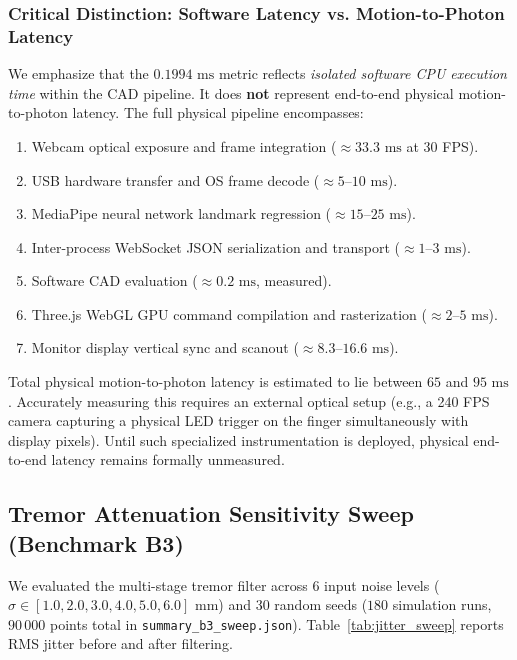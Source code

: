\subsubsection{Critical Distinction: Software Latency vs. Motion-to-Photon Latency}
We emphasize that the $0.1994\text{ ms}$ metric reflects \textit{isolated software CPU execution time} within the CAD pipeline. It does \textbf{not} represent end-to-end physical motion-to-photon latency. The full physical pipeline encompasses:
\begin{enumerate}
    \item Webcam optical exposure and frame integration ($\approx 33.3\text{ ms}$ at 30 FPS).
    \item USB hardware transfer and OS frame decode ($\approx 5$--$10\text{ ms}$).
    \item MediaPipe neural network landmark regression ($\approx 15$--$25\text{ ms}$).
    \item Inter-process WebSocket JSON serialization and transport ($\approx 1$--$3\text{ ms}$).
    \item Software CAD evaluation ($\approx 0.2\text{ ms}$, measured).
    \item Three.js WebGL GPU command compilation and rasterization ($\approx 2$--$5\text{ ms}$).
    \item Monitor display vertical sync and scanout ($\approx 8.3$--$16.6\text{ ms}$).
\end{enumerate}
Total physical motion-to-photon latency is estimated to lie between $65$ and $95\text{ ms}$. Accurately measuring this requires an external optical setup (e.g., a 240 FPS camera capturing a physical LED trigger on the finger simultaneously with display pixels). Until such specialized instrumentation is deployed, physical end-to-end latency remains formally unmeasured.

\subsection{Tremor Attenuation Sensitivity Sweep (Benchmark B3)}
We evaluated the multi-stage tremor filter across 6 input noise levels ($\sigma \in [1.0, 2.0, 3.0, 4.0, 5.0, 6.0]\text{ mm}$) and 30 random seeds ($180$ simulation runs, $90\,000$ points total in \texttt{summary\_b3\_sweep.json}). Table~\ref{tab:jitter_sweep} reports RMS jitter before and after filtering.

